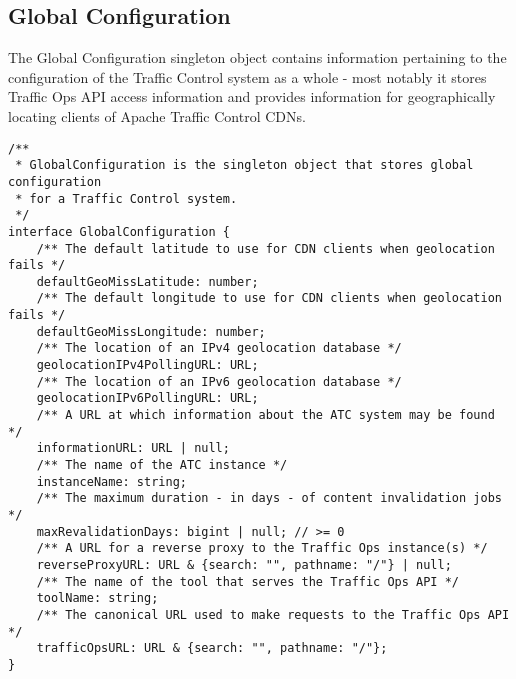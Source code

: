 %
%

\subsection{Global Configuration}
The Global Configuration singleton object contains information pertaining to the
configuration of the Traffic Control system as a whole - most notably it stores
Traffic Ops API access information and provides information for geographically
locating clients of Apache Traffic Control CDNs.

\begin{codelisting}
\label{code:datamodel:global-configuration}
\begin{verbatim}
/**
 * GlobalConfiguration is the singleton object that stores global configuration
 * for a Traffic Control system.
 */
interface GlobalConfiguration {
	/** The default latitude to use for CDN clients when geolocation fails */
	defaultGeoMissLatitude: number;
	/** The default longitude to use for CDN clients when geolocation fails */
	defaultGeoMissLongitude: number;
	/** The location of an IPv4 geolocation database */
	geolocationIPv4PollingURL: URL;
	/** The location of an IPv6 geolocation database */
	geolocationIPv6PollingURL: URL;
	/** A URL at which information about the ATC system may be found */
	informationURL: URL | null;
	/** The name of the ATC instance */
	instanceName: string;
	/** The maximum duration - in days - of content invalidation jobs */
	maxRevalidationDays: bigint | null; // >= 0
	/** A URL for a reverse proxy to the Traffic Ops instance(s) */
	reverseProxyURL: URL & {search: "", pathname: "/"} | null;
	/** The name of the tool that serves the Traffic Ops API */
	toolName: string;
	/** The canonical URL used to make requests to the Traffic Ops API */
	trafficOpsURL: URL & {search: "", pathname: "/"};
}
\end{verbatim}
\end{codelisting}

